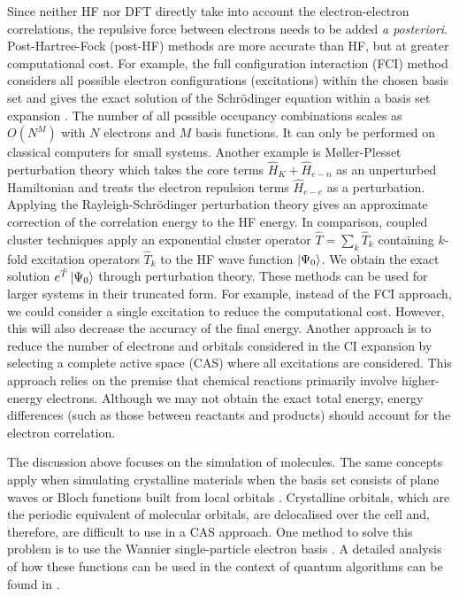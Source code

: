 \documentclass[10pt]{iopart}
\begin{document}
Since neither HF nor DFT directly take into account the electron-electron correlations, the repulsive force between electrons needs to be added \textit{a posteriori}. Post-Hartree-Fock (post-HF) methods are more accurate than HF, but at greater computational cost. For example, the full configuration interaction (FCI) method considers all possible electron configurations (excitations) within the chosen basis set and gives the exact solution of the Schr{\"o}dinger equation within a basis set expansion \cite{Eriksen2021}. 
The number of all possible occupancy combinations scales as $O(N^M)$ with $N$ electrons and $M$ basis functions. It can only be performed on classical computers for small systems. Another example is M{\o}ller-Plesset perturbation theory \cite{Moller1934} which takes the core terms $\hat{H}_K+\hat{H}_{e-n}$ as an unperturbed Hamiltonian and treats the electron repulsion terms $\hat{H}_{e-e}$ as a perturbation. Applying the Rayleigh-Schr{\"o}dinger perturbation theory gives an approximate correction of the correlation energy to the HF energy. In comparison, coupled cluster techniques \cite{Cizek1966} apply an exponential cluster operator $\hat{T} = \sum_k \hat{T}_k$ containing $k$-fold excitation operators $\hat{T}_k$ to the HF wave function $\ket{\Psi_0}$. We obtain the exact solution $e^{\hat{T}} \ket{\Psi_0}$ through perturbation theory. 
These methods can be used for larger systems in their truncated form. For example, instead of the FCI approach, we could consider a single excitation to reduce the computational cost. However, this will also decrease the accuracy of the final energy. Another approach is to reduce the number of electrons and orbitals considered in the CI expansion by selecting a complete active space (CAS) where all excitations are considered. This approach relies on the premise that chemical reactions primarily involve higher-energy electrons. Although we may not obtain the exact total energy, energy differences (such as those between reactants and products) should account for the electron correlation. 

The discussion above focuses on the simulation of molecules. The same concepts apply when simulating crystalline materials when the basis set consists of plane waves \cite{Singh2006} or Bloch functions built from local orbitals \cite{Hoffmann1987}. Crystalline orbitals, which are the periodic equivalent of molecular orbitals, are delocalised over the cell and, therefore, are difficult to use in a CAS approach. One method to solve this problem is to use the Wannier single-particle electron basis \cite{Wannier1937}. A detailed analysis of how these functions can be used in the context of quantum algorithms can be found in \cite{Clinton2022}.
\end{document}
